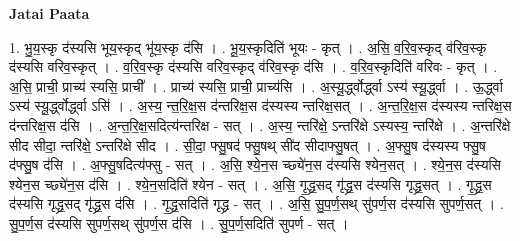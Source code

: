 \documentclass[17pt]{extarticle}
\begin{document}
\textbf{Jatai Paata} \newline

1. भु॒य॒स्कृ द॑स्यसि भूय॒स्कृद् भू॑य॒स्कृ द॑सि । . भू॒य॒स्कृदिति॑ भूयः - कृत् । . अ॒सि॒ व॒रि॒व॒स्कृद् व॑रिव॒स्कृ द॑स्यसि वरिव॒स्कृत् । . व॒रि॒व॒स्कृ द॑स्यसि वरिव॒स्कृद् व॑रिव॒स्कृ द॑सि । . व॒रि॒व॒स्कृदिति॑ वरिवः - कृत् । . अ॒सि॒ प्राची॒ प्राच्य॑ स्यसि॒ प्राची᳚ । . प्राच्य॑ स्यसि॒ प्राची॒ प्राच्य॑सि । . अ॒स्यू॒र्द्ध्वोर्द्ध्वा ऽस्य॑ स्यू॒र्द्ध्वा । . ऊ॒र्द्ध्वा ऽस्य॑ स्यू॒र्द्ध्वोर्द्ध्वा ऽसि॑ । . अ॒स्य॒ न्त॒रि॒क्ष॒स द॑न्तरिक्ष॒स द॑स्यस्य न्तरिक्ष॒सत् । . अ॒न्त॒रि॒क्ष॒स द॑स्यस्य न्तरिक्ष॒स द॑न्तरिक्ष॒स द॑सि । . अ॒न्त॒रि॒क्ष॒सदित्य॑न्तरिक्ष - सत् । . अ॒स्य॒ न्तरि॑क्षे॒ ऽन्तरि॑क्षे ऽस्यस्य॒ न्तरि॑क्षे । . अ॒न्तरि॑क्षे सीद सीदा॒ न्तरि॑क्षे॒ ऽन्तरि॑क्षे सीद । . सी॒दा॒ फ्सु॒षद॑ फ्सु॒षथ् सी॑द सीदाफ्सु॒षत् । . अ॒फ्सु॒ष द॑स्यस्य फ्सु॒ष द॑फ्सु॒ष द॑सि । . अ॒फ्सु॒षदित्य॑फ्सु - सत् । . अ॒सि॒ श्ये॒न॒स च्छ्ये॑न॒स द॑स्यसि श्येन॒सत् । . श्ये॒न॒स द॑स्यसि श्येन॒स च्छ्ये॑न॒स द॑सि । . श्ये॒न॒सदिति॑ श्येन - सत् । . अ॒सि॒ गृ॒द्ध्र॒सद् गृ॑द्ध्र॒स द॑स्यसि गृद्ध्र॒सत् । . गृ॒द्ध्र॒स द॑स्यसि गृद्ध्र॒सद् गृ॑द्ध्र॒स द॑सि । . गृ॒द्ध्र॒सदिति॑ गृद्ध्र - सत् । . अ॒सि॒ सु॒प॒र्ण॒सथ् सु॑पर्ण॒स द॑स्यसि सुपर्ण॒सत् । . सु॒प॒र्ण॒स द॑स्यसि सुपर्ण॒सथ् सु॑पर्ण॒स द॑सि । . सु॒प॒र्ण॒सदिति॑ सुपर्ण - सत् । \newline
\end{document}
